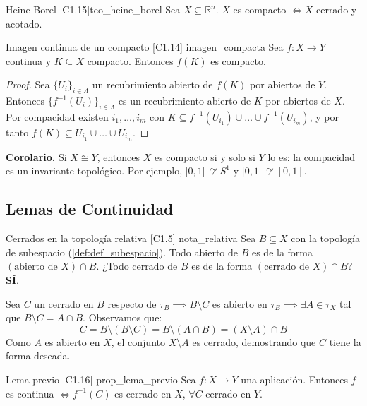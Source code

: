 \begin{teorema}{Heine-Borel [C1.15]}{teo_heine_borel}
Sea $X \subseteq \mathbb{R}^n$. $X$ es compacto $\iff X$ cerrado y acotado.
\end{teorema}

\begin{teorema}{Imagen continua de un compacto [C1.14] \marcaE}{imagen_compacta}
Sea $f \colon X \to Y$ continua y $K \subseteq X$ compacto. Entonces $f(K)$ es compacto.
\end{teorema}
 
\begin{proof}
Sea $\{U_i\}_{i \in \Lambda}$ un recubrimiento abierto de $f(K)$ por abiertos de $Y$. Entonces $\{f^{-1}(U_i)\}_{i \in \Lambda}$ es un recubrimiento abierto de $K$ por abiertos de $X$. Por compacidad existen $i_1, \dots, i_m$ con $K \subseteq f^{-1}(U_{i_1}) \cup \dots \cup f^{-1}(U_{i_m})$, y por tanto $f(K) \subseteq U_{i_1} \cup \dots \cup U_{i_m}$.
\end{proof}
 
\textbf{Corolario.} Si $X \cong Y$, entonces $X$ es compacto si y solo si $Y$ lo es: la compacidad es un invariante topológico. Por ejemplo, $[0,1[ \,\not\cong S^1$ y $]0,1[ \,\not\cong [0,1]$.


\subsection{Lemas de Continuidad}

\begin{nota}{Cerrados en la topología relativa [C1.5] \marcaE}{nota_relativa}
Sea $B \subseteq X$ con la topología de subespacio (\cref{def:def_subespacio}). Todo abierto de $B$ es de la forma $(\text{abierto de } X) \cap B$.
¿Todo cerrado de $B$ es de la forma $(\text{cerrado de } X) \cap B$? \textbf{SÍ}.

Sea $C$ un cerrado en $B$ respecto de $\tau_B \implies B \setminus C$ es abierto en $\tau_B \implies \exists A \in \tau_X$ tal que $B \setminus C = A \cap B$.
Observamos que:
\[ C = B \setminus (B \setminus C) = B \setminus (A \cap B) = (X \setminus A) \cap B \]
Como $A$ es abierto en $X$, el conjunto $X \setminus A$ es cerrado, demostrando que $C$ tiene la forma deseada.
\end{nota}

\begin{proposicion}{Lema previo [C1.16] \marcaE}{prop_lema_previo}
Sea $f \colon X \to Y$ una aplicación. Entonces $f$ es continua $\iff f^{-1}(C)$ es cerrado en $X$, $\forall C$ cerrado en $Y$.
\end{proposicion}

